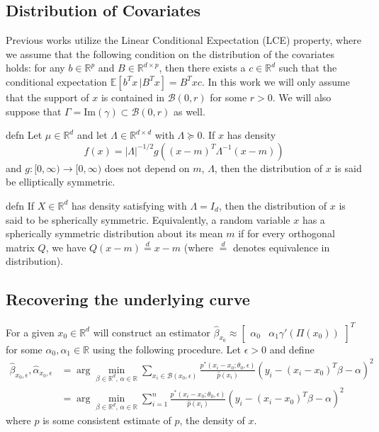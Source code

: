 \documentclass[11pt]{article}
\begin{document}
\subsection{Distribution of Covariates}
Previous works utilize the Linear Conditional Expectation (LCE) property, where we assume that the following condition on the distribution of the covariates holds: for any $b \in \mathbb{R}^p$ and $B \in \mathbb{R}^{d\times p}$, then there exists a $c \in \mathbb{R}^d$ such that the conditional expectation $\mathbb{E}[b^{T}x \, | B^{T}x] = B^{T}xc$. In this work we will only assume that the support of $x$ is contained in $\mathcal{B}(0, r)$ for some $r > 0$. We will also suppose that $\Gamma  = \text{Im}(\gamma) \subset \mathcal{B}(0, r)$ as well. 

\begin{restatable}{defn}{}\label{def: elliptical symmetry}
Let $\mu \in \mathbb{R}^d$ and let $\Lambda \in \mathbb{R}^{d\times d}$ with $\Lambda \succeq 0$. If $x$ has density
\begin{equation}
     f(x) = |\Lambda|^{-1/2}g\left((x-m)^{T}\Lambda^{-1}(x - m)\right)
\end{equation}
and $g:[0, \infty) \rightarrow[0, \infty)$ does not depend on $m$, $\Lambda$, then the distribution of $x$ is said be elliptically symmetric. 
\end{restatable}

\begin{restatable}{defn}{}\label{def: spherical symmetry}
If $X\in \mathbb{R}^d$ has density satisfying  with $\Lambda = I_d$, then the distribution of $x$ is said to be spherically symmetric. Equivalently, a random variable $x$ has a spherically symmetric distribution about its mean $m$ if for every orthogonal matrix $Q$, we have $Q(x - m) \overset{d}{=} x - m$ (where $\overset{d}{=}$ denotes equivalence in distribution). 
\end{restatable}

\subsection{Recovering the underlying curve}
For a given $x_0 \in \mathbb{R}^d$ will construct an estimator $\widehat{\beta}_{x_0} \approx  \begin{bmatrix} \alpha_0 & \alpha_1\gamma'(\Pi(x_0)) \end{bmatrix}^T$ for some $\alpha_0, \alpha_1 \in \mathbb{R}$ using the following procedure. Let $\epsilon > 0$ and define
\begin{align} 
\widehat{\beta}_{x_0,\epsilon}, \widehat{\alpha}_{x_0, \epsilon} &= \arg\min_{\beta \in \mathbb{R}^d,\, \alpha \in \mathbb{R}} \sum_{x_i \in \mathcal{B}(x_0, \epsilon)}\frac{p^*(x_i - x_0;\theta_0, \epsilon)}{\hat{p}(x_i)}\left(y_i - (x_i - x_0)^{T}\beta - \alpha\right)^2 \\
&= \arg\min_{\beta \in \mathbb{R}^d,\, \alpha \in \mathbb{R}} \sum_{i = 1}^{n}\frac{p^*(x_i - x_0;\theta_0, \epsilon)}{\hat{p}(x_i)}\left(y_i - (x_i - x_0)^{T}\beta - \alpha\right)^2
\end{align}
where $\hat{p}$ is some consistent estimate of $p$, the density of $x$. 
\end{document}
